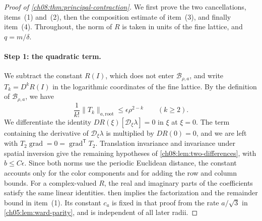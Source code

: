 \begin{proof}[Proof of \cref{ch08:thm:principal-contraction}]
We first prove the two cancellations, items~(1) and~(2), then the composition estimate of item~(3), and finally item~(4). Throughout, the norm of $R$ is taken in units of the fine lattice, and $q=m/\delta$.

\paragraph{Step 1: the quadratic term.}
We subtract the constant $R(I)$, which does not enter $\mathcal B_{\rho,a}$, and write $T_k=D^kR(I)$ in the logarithmic coordinates of the fine lattice. By the definition of $\mathcal B_{\rho,a}$, we have
\begin{equation}\label{ch08:eq:primitive-bound}
 \frac1{k!}\|T_k\|_{a,\mathrm{root}}
       \le\epsilon\rho^{2-k}\qquad(k\ge2).
\end{equation}
We differentiate the identity $DR(\xi)[\mathcal D_\xi\lambda]=0$ in $\xi$ at $\xi=0$. The term containing the derivative of $\mathcal D_\xi\lambda$ is multiplied by $DR(0)=0$, and we are left with $T_2\operatorname{grad}=0=\operatorname{grad}^{\mathsf T}T_2$. Translation invariance and invariance under spatial inversion give the remaining hypotheses of \cref{ch08:lem:two-differences}, with $b\le C\epsilon$. Since both norms use the periodic Euclidean distance, the constant accounts only for the color components and for adding the row and column bounds. For a complex-valued $R$, the real and imaginary parts of the coefficients satisfy the same linear identities.  then implies the factorization and the remainder bound in item~(1). Its constant $c_a$ is fixed in that proof from the rate $a/\sqrt3$ in \cref{ch05:lem:ward-parity}, and is independent of all later radii.


\end{proof}
